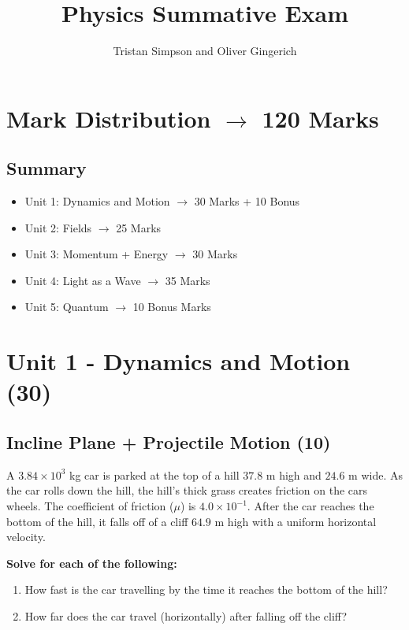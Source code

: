 \documentclass{article}
\title{Physics Summative Exam}
\author{Tristan Simpson and Oliver Gingerich}
\begin{document}
\maketitle
\tableofcontents
\doublespacing

\section{Mark Distribution $\to$ 120 Marks}
\subsection{Summary}
\begin{itemize}
    \item Unit 1: Dynamics and Motion $\to$ 30 Marks + 10 Bonus
    \item Unit 2: Fields $\to$ 25 Marks
    \item Unit 3: Momentum + Energy $\to$ 30 Marks
    \item Unit 4: Light as a Wave $\to$ 35 Marks
    \item Unit 5: Quantum $\to$ 10 Bonus Marks
\end{itemize}

\section{Unit 1 - Dynamics and Motion (30)}
\subsection{Incline Plane + Projectile Motion (10)}
A $3.84 \times 10^3$ kg car is parked at the top of a hill $37.8$ m high and $24.6$ m wide.
As the car rolls down the hill, the hill's thick grass creates friction on the cars wheels. The coefficient of
friction ($\mu$) is $4.0\times 10^{-1}$. After the car reaches the bottom of the hill, it falls
off of a cliff $64.9$ m high with a uniform horizontal velocity.

\vspace{10pt}

\noindent\textbf{Solve for each of the following:}
\begin{enumerate}[label=\alph*)]
    \item How fast is the car travelling by the time it reaches the bottom of the hill?
    \item How far does the car travel (horizontally) after falling off the cliff?
\end{enumerate}\leavevmode
\end{document}
